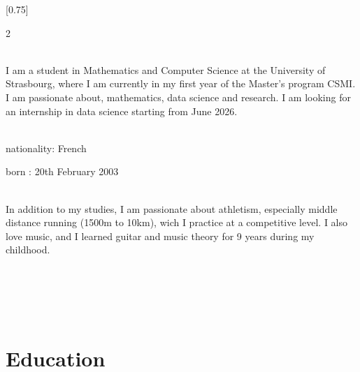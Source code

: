 \documentclass[lighthipster]{simplehipstercv}
\begin{document}
\setlength{\columnsep}{1.5cm}
[0.75]
\begin{paracol}{2}

\paracolbackgroundoptions



\footnotesize
{\setasidefontcolour
\flushright
\begin{center}
\end{center}

\\[0.5em]
I am a student in Mathematics and Computer Science at the University of Strasbourg,
where I am currently in my first year of the Master's program CSMI.
I am passionate about, mathematics, data science and research. 
I am looking for an internship in data science starting from June 2026.

\bigskip

 \\[0.5em]

nationality: French

born : 20th February 2003

\bigskip

\\[0.5em]
In addition to my studies, I am passionate about athletism, 
especially middle distance running (1500m to 10km), wich I practice at a competitive level. 
I also love music, and I learned guitar and music theory for 9 years during my childhood.
\bigskip

\\[0.5em]
\begin{flushright}
\\[0.2cm]
\\[0.2cm]
\end{flushright}

\phantom{turn the page}

\phantom{turn the page}
}
\switchcolumn

\small
\section*{Education}


\end{paracol}
\end{document}
